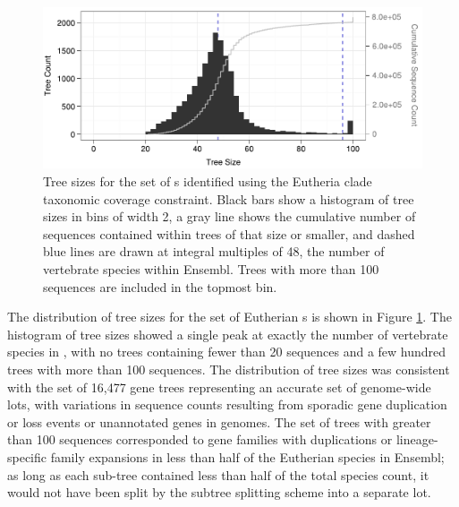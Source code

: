 \begin{figure}
\centering
\includegraphics[scale=0.9]{Figs/hist_euth_roots.pdf}
\caption{Tree sizes for the set of \subtr{}s identified using the
  Eutheria clade taxonomic coverage constraint. Black bars show a
  histogram of tree sizes in bins of width 2, a gray line shows
  the cumulative number of sequences contained within trees of that
  size or smaller, and dashed blue lines are drawn at integral
  multiples of 48, the number of vertebrate species within
  Ensembl. Trees with more than 100 sequences are included in the
  topmost bin.}
\label{fig_ensembl_euth_hist}
\end{figure}

The distribution of tree sizes for the set of Eutherian \subtr{}s is
shown in Figure \ref{fig_ensembl_euth_hist}. The histogram of tree
sizes showed a single peak at exactly the number of vertebrate species
in \ens, with no trees containing fewer than 20 sequences and a few
hundred trees with more than 100 sequences. The distribution of tree
sizes was consistent with the set of 16,477 gene trees representing an
accurate set of genome-wide \mammln \acp{lot}, with variations in
sequence counts resulting from sporadic gene duplication or loss
events or unannotated genes in \lcv genomes.  The
set of trees with greater than 100 sequences corresponded to gene
families with duplications or lineage-specific family expansions in
less than half of the Eutherian species in Ensembl; as long as each
sub-tree contained less than half of the total species count, it would
not have been split by the subtree splitting scheme into a separate
\ac{lot}.

